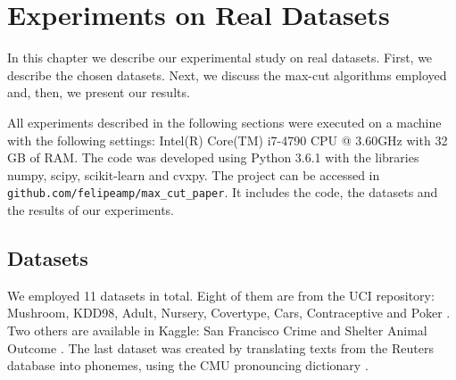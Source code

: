 \newpage

\chapter{Experiments on Real Datasets}
\label{chap:experimentsdatasets}


In this chapter we describe our
experimental study on real datasets.
First, we describe the chosen datasets.
Next, we discuss the max-cut algorithms 
employed and, then, we
present our results.

All  experiments described in the following sections were executed on a machine with the following settings: Intel(R) Core(TM) i7-4790 CPU @ 3.60GHz with 32 GB of RAM. The code was developed using Python 3.6.1 with the libraries numpy, scipy, scikit-learn and cvxpy.
The project can be accessed in {\tt github.com/felipeamp/max\_cut\_paper}. It includes  the code, the datasets and the results of our experiments.


\section{Datasets}
We employed 11 datasets in total. Eight of them are from the UCI repository:
Mushroom, KDD98, Adult, Nursery, Covertype, Cars, Contraceptive and Poker  \cite{Lichman:2013}.
Two others are available in Kaggle: San Francisco Crime and Shelter Animal Outcome
\cite{SFC,AnimalShelter}. The last dataset was created by translating texts from the Reuters database \cite{Lichman:2013} into phonemes, using the CMU pronouncing dictionary \cite{CMU-PD}.

